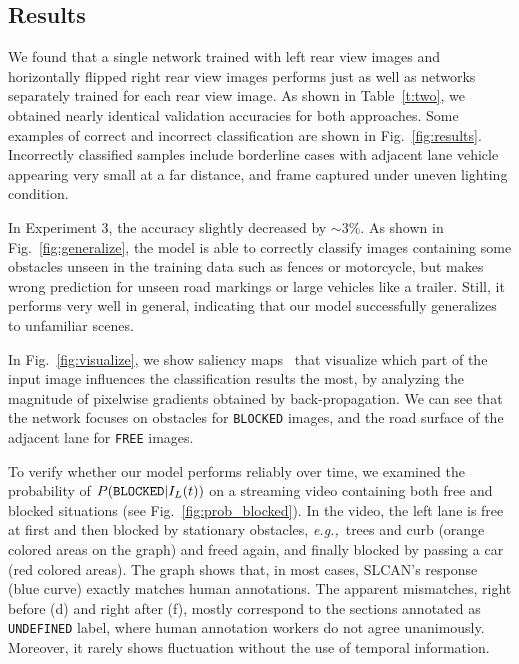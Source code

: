 \documentclass[letterpaper, 10pt, conference]{ieeeconf}
\newcommand{\eg}{\textit{e.g.,}~}
\begin{document}
	\subsection{Results}%
         
    We found that a single network trained with left rear view images and horizontally
flipped right rear view images performs just as well as networks separately trained for
each rear view image. As shown in Table~\ref{t:two}, we obtained nearly identical validation 
accuracies for both approaches. Some examples of correct and incorrect classification are 
shown in Fig.~\ref{fig:results}. Incorrectly classified samples include borderline cases 
with adjacent lane vehicle appearing very small at a far distance, and frame captured 
under uneven lighting condition.

    In Experiment 3, the accuracy slightly decreased by $\sim$3\%. As shown in 
Fig.~\ref{fig:generalize}, the model is able to correctly classify images containing 
some obstacles unseen in the training data such as fences or motorcycle, but makes 
wrong prediction for unseen road markings or large vehicles like a trailer. Still, 
it performs very well in general, indicating that our model successfully generalizes 
to unfamiliar scenes.

    In Fig.~\ref{fig:visualize}, we show saliency maps~\cite{Simonyan2014a} that
visualize which part of the input image influences the classification results 
the most, by analyzing the magnitude of pixelwise gradients obtained by back-propagation. 
We can see that the network focuses on obstacles for \texttt{BLOCKED} images, and the 
road surface of the adjacent lane for \texttt{FREE} images.
    
	To verify whether our model performs reliably over time, we examined the probability 
of $P({\tt BLOCKED}|I_L(t))$ on a streaming video containing both free and blocked 
situations (see Fig.~\ref{fig:prob_blocked}). In the video, the left lane is free at 
first and then blocked by stationary obstacles, \eg trees and curb (orange colored 
areas on the graph) and freed again, and finally blocked by passing a car (red colored areas). 
The graph shows that, in most cases, SLCAN's response (blue curve) exactly matches 
human annotations. The apparent mismatches, right before (d) and right after (f), 
mostly correspond to the sections annotated as {\tt UNDEFINED} label, where human 
annotation workers do not agree unanimously. Moreover, it rarely shows fluctuation 
without the use of temporal information.
	
\end{document}
